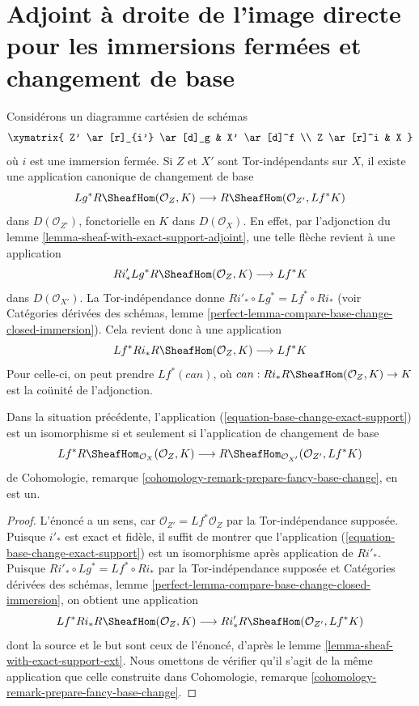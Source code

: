 \section{Adjoint à droite de l'image directe pour les immersions fermées et changement de base}
\label{section-sections-with-exact-support-base-change}

\noindent
Considérons un diagramme cartésien de schémas
$$
\xymatrix{
Z' \ar[r]_{i'} \ar[d]_g & X' \ar[d]^f \\
Z \ar[r]^i & X
}
$$
où $i$ est une immersion fermée. Si $Z$ et $X'$ sont Tor-indépendants sur $X$, il existe une application canonique de changement de base
\begin{equation}
\label{equation-base-change-exact-support}
Lg^*R\SheafHom(\mathcal{O}_Z, K)
\longrightarrow
R\SheafHom(\mathcal{O}_{Z'}, Lf^*K)
\end{equation}
dans $D(\mathcal{O}_{Z'})$, fonctorielle en $K$ dans $D(\mathcal{O}_X)$. En effet, par l'adjonction du lemme \ref{lemma-sheaf-with-exact-support-adjoint}, une telle flèche revient à une application
$$
Ri'_*Lg^*R\SheafHom(\mathcal{O}_Z, K)
\longrightarrow
Lf^*K
$$
dans $D(\mathcal{O}_{X'})$. La Tor-indépendance donne $Ri'_* \circ Lg^* = Lf^* \circ Ri_*$ (voir Catégories dérivées des schémas, lemme \ref{perfect-lemma-compare-base-change-closed-immersion}). Cela revient donc à une application
$$
Lf^*Ri_*R\SheafHom(\mathcal{O}_Z, K)
\longrightarrow
Lf^*K
$$
Pour celle-ci, on peut prendre $Lf^*(can)$, où $can : Ri_* R\SheafHom(\mathcal{O}_Z, K) \to K$ est la coünité de l'adjonction.

\begin{lemma}
\label{lemma-check-base-change-is-iso}
Dans la situation précédente, l'application (\ref{equation-base-change-exact-support}) est un isomorphisme si et seulement si l'application de changement de base
$$
Lf^*R\SheafHom_{\mathcal{O}_X}(\mathcal{O}_Z, K)
\longrightarrow
R\SheafHom_{\mathcal{O}_{X'}}(\mathcal{O}_{Z'}, Lf^*K)
$$
de Cohomologie, remarque \ref{cohomology-remark-prepare-fancy-base-change}, en est un.
\end{lemma}

\begin{proof}
L'énoncé a un sens, car $\mathcal{O}_{Z'} = Lf^*\mathcal{O}_Z$ par la Tor-indépendance supposée. Puisque $i'_*$ est exact et fidèle, il suffit de montrer que l'application (\ref{equation-base-change-exact-support}) est un isomorphisme après application de $Ri'_*$. Puisque $Ri'_* \circ Lg^* = Lf^* \circ Ri_*$ par la Tor-indépendance supposée et Catégories dérivées des schémas, lemme \ref{perfect-lemma-compare-base-change-closed-immersion}, on obtient une application
$$
Lf^*Ri_*R\SheafHom(\mathcal{O}_Z, K)
\longrightarrow
Ri'_*R\SheafHom(\mathcal{O}_{Z'}, Lf^*K)
$$
dont la source et le but sont ceux de l'énoncé, d'après le lemme \ref{lemma-sheaf-with-exact-support-ext}. Nous omettons de vérifier qu'il s'agit de la même application que celle construite dans Cohomologie, remarque \ref{cohomology-remark-prepare-fancy-base-change}.
\end{proof}

